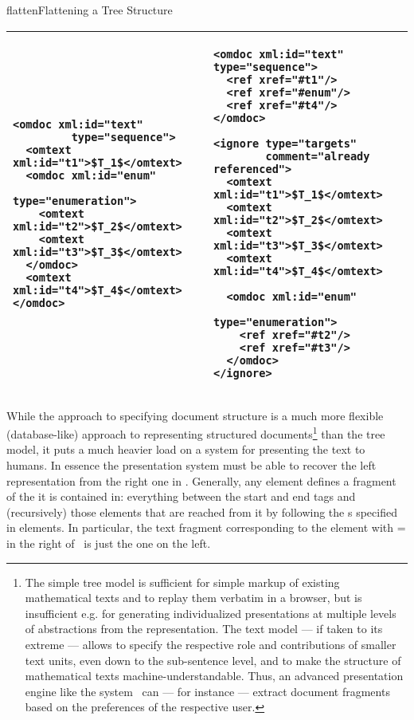 \begin{omgroup}[id=omdoc-infrastructure,short=Document Infrastructure]
\begin{module}[id=sharing]
\begin{omgroup}[id=sharing,short=Sharing Document Parts]
\begin{myfig}{flatten}{Flattening a Tree Structure}
\begin{tabular}{|p{5.1cm}|p{5.5cm}|}\hline
\begin{lstlisting}
<omdoc xml:id="text" 
         type="sequence">
  <omtext xml:id="t1">$T_1$</omtext>
  <omdoc xml:id="enum" 
            type="enumeration">
    <omtext xml:id="t2">$T_2$</omtext>
    <omtext xml:id="t3">$T_3$</omtext>
  </omdoc>
  <omtext xml:id="t4">$T_4$</omtext>
</omdoc>
\end{lstlisting}
& 
\begin{lstlisting}
<omdoc xml:id="text" type="sequence">
  <ref xref="#t1"/>
  <ref xref="#enum"/>
  <ref xref="#t4"/>
</omdoc>

<ignore type="targets"
        comment="already referenced"> 
  <omtext xml:id="t1">$T_1$</omtext>
  <omtext xml:id="t2">$T_2$</omtext>
  <omtext xml:id="t3">$T_3$</omtext>
  <omtext xml:id="t4">$T_4$</omtext>

  <omdoc xml:id="enum" 
           type="enumeration">
    <ref xref="#t2"/>
    <ref xref="#t3"/>
  </omdoc>
</ignore>
\end{lstlisting}\\\hline
\end{tabular}
\end{myfig}

While the \omdoc approach to specifying document structure is a much more flexible
(database-like) approach to representing structured documents\footnote{The simple tree
  model is sufficient for simple markup of existing mathematical texts and to replay them
  verbatim in a browser, but is insufficient e.g. for generating individualized
  presentations at multiple levels of abstractions from the representation. The \omdoc
  text model --- if taken to its extreme --- allows to specify the respective role and
  contributions of smaller text units, even down to the sub-sentence level, and to make
  the structure of mathematical texts machine-understandable. Thus, an advanced
  presentation engine like the {\activemath} system~\cite{SieBen:acgap00} can --- for
  instance --- extract document fragments based on the preferences of the respective
  user.}  than the tree model, it puts a much heavier load on a system for presenting the
text to humans. In essence the presentation system must be able to recover the left
representation from the right one in {}.  Generally, any \omdoc
element defines a fragment of the \omdoc it is contained in: everything between the
start and end tags and (recursively) those elements that are reached from it by following
the {s} specified in  elements.  In particular,
the text fragment corresponding to the element with
={} in the right \omdoc
of~ is just the one on the left.


\end{omgroup}
\end{module}
\end{omgroup}
